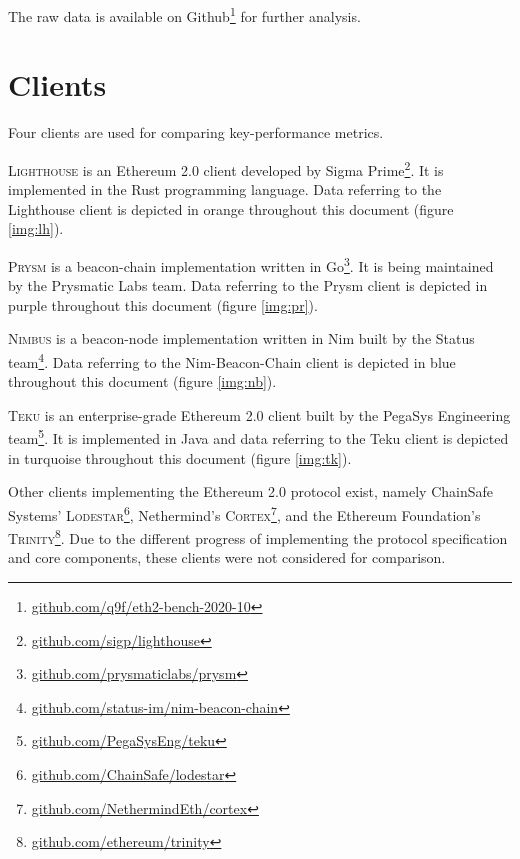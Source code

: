 \documentclass[twoside,twocolumn]{article}
\begin{document}
The raw data is available on Github\footnote{\href{https://github.com/q9f/eth2-bench-2020-10}{github.com/q9f/eth2-bench-2020-10}} for further analysis.

\section{Clients}
\label{sec:cli}

Four clients are used for comparing key-performance metrics.\par

\textsc{Lighthouse} is an Ethereum 2.0 client developed by Sigma Prime\footnote{\href{https://github.com/sigp/lighthouse}{github.com/sigp/lighthouse}}. It is implemented in the Rust programming language. Data referring to the Lighthouse client is depicted in orange throughout this document (figure \ref{img:lh}).\par

\textsc{Prysm} is a beacon-chain implementation written in Go\footnote{\href{https://github.com/prysmaticlabs/prysm}{github.com/prysmaticlabs/prysm}}. It is being maintained by the Prysmatic Labs team. Data referring to the Prysm client is depicted in purple throughout this document (figure \ref{img:pr}).\par

\textsc{Nimbus} is a beacon-node implementation written in Nim built by the Status team\footnote{\href{https://github.com/status-im/nim-beacon-chain}{github.com/status-im/nim-beacon-chain}}. Data referring to the Nim-Beacon-Chain client is depicted in blue throughout this document (figure \ref{img:nb}).\par

\textsc{Teku} is an enterprise-grade Ethereum 2.0 client built by the PegaSys Engineering team\footnote{\href{https://github.com/PegaSysEng/teku}{github.com/PegaSysEng/teku}}. It is implemented in Java and data referring to the Teku client is depicted in turquoise throughout this document (figure \ref{img:tk}).\par

Other clients implementing the Ethereum 2.0 protocol exist, namely ChainSafe Systems' \textsc{Lodestar}\footnote{\href{https://github.com/ChainSafe/lodestar}{github.com/ChainSafe/lodestar}}, Nethermind's \textsc{Cortex}\footnote{\href{https://github.com/NethermindEth/cortex}{github.com/NethermindEth/cortex}}, and the Ethereum Foundation's \textsc{Trinity}\footnote{\href{https://github.com/ethereum/trinity}{github.com/ethereum/trinity}}. Due to the different progress of implementing the protocol specification and core components, these clients were not considered for comparison.\par
\end{document}
